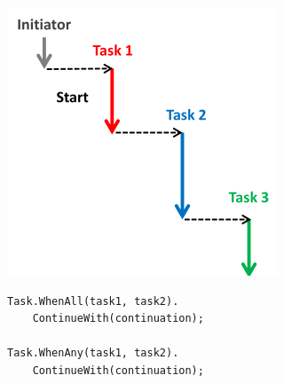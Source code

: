 \documentclass[11pt,twoside,landscape]{article}
\begin{document}
\begin{multicols}{3}
{{{
\begin{center}
\includegraphics[width=.9\linewidth]{img/task_continuations.png}
\end{center}
\label{fig:task-continuations}
}


\lstset{language=csharp,label= ,caption= ,captionpos=b,numbers=none}
\begin{lstlisting}
Task.WhenAll(task1, task2).
    ContinueWith(continuation);

Task.WhenAny(task1, task2).
    ContinueWith(continuation);
\end{lstlisting}

}}
\end{multicols}
\end{document}

